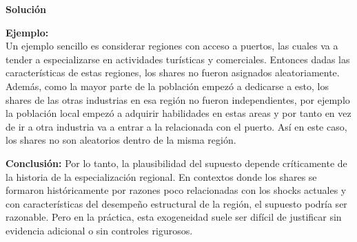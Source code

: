 \documentclass[a4paper, answers, addpoints, 11pt]{exam}
\newenvironment{solucion}{%
  \begin{mdframed}[
    backgroundcolor=blue!5,    %
    linecolor=blue!50,          %
    linewidth=2pt,              %
    leftmargin=10pt,            %
    rightmargin=8pt,           %
    topline=true,              %
    bottomline=true,            %
    roundcorner=10pt,           %
    innerleftmargin=10pt,       %
    innerrightmargin=10pt,      %
    innerbottommargin=10pt,     %
    innertopmargin=10pt         %
  ]%
  \begin{tcolorbox}[colframe=blue!50!black, colback=blue!50, coltitle=white, sharp corners=all, boxrule=1mm, width=\textwidth, halign=left, valign=center, top=0mm, bottom=0mm, left=0mm, right=0mm] \textbf{Solución} \end{tcolorbox} }{\end{mdframed}}
\begin{document}
\begin{enumerate}
\begin{solucion}
\textbf{Ejemplo:}\\
Un ejemplo sencillo es considerar regiones con acceso a puertos, las cuales va a tender a especializarse en actividades turísticas y comerciales. Entonces dadas las características de estas regiones, los shares no fueron asignados aleatoriamente. Además, como la mayor parte de la población empezó a dedicarse a esto, los shares de las otras industrias en esa región no fueron independientes, por ejemplo la población local empezó a adquirir habilidades en estas areas y por tanto en vez de ir a otra industria va a entrar a la relacionada con el puerto. Así en este caso, los shares no son aleatorios dentro de la misma región.


\textbf{Conclusión:}
Por lo tanto, la plausibilidad del supuesto depende críticamente de la historia de la especialización regional. En contextos donde los shares se formaron históricamente por razones poco relacionadas con los shocks actuales y con características del desempeño estructural de la región, el supuesto podría ser razonable. Pero en la práctica, esta exogeneidad suele ser difícil de justificar sin evidencia adicional o sin controles rigurosos.
\end{solucion}
    

\end{enumerate}
\end{document}
